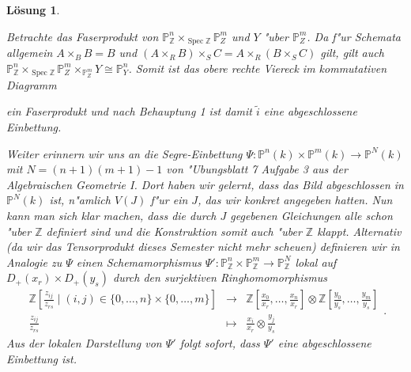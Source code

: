 \documentclass[paper = A4, fontsize=12pt, numbers=noendperiod, chapterprefix=true]{scrbook}
\theoremstyle{break}
\newtheorem{Loes}{L\"osung}
\theoremstyle{nonumberbreak}
\theoremstyle{nonumberplain}
\DeclareMathOperator{\Spec}{Spec}
\newcommand{\IP}{\mathbb{P}}%
\newcommand{\Z}{\mathbb{Z}}
\begin{document}
\begin{Loes}
\begin{enumerate}[a)]
 Betrachte das Faserprodukt von $\IP^n_{\Z} \times_{\Spec \Z} \IP^m_Z$ und $Y$ "uber $\IP^m_Z$.
 Da f"ur Schemata allgemein $A \times_B B = B$ und $(A \times_R B) \times_S C =  A \times_R (B \times_S C)$ gilt, gilt auch $\IP^n_{\Z} \times_{\Spec \Z} \IP^m_Z \times_{\IP^m_Z} Y \cong \IP^n_Y$. Somit ist das obere rechte Viereck im kommutativen Diagramm 
 
 \begin{minipage}{7.9cm}
 \centering
{}
\end{minipage}
\begin{minipage}{7cm}
  ein Faserprodukt und nach Behauptung 1 ist damit $\tilde{i}$ eine abgeschlossene Einbettung.
\end{minipage}

 Weiter erinnern wir uns an die Segre-Einbettung $\Psi \colon \IP^n(k) \times \IP^m(k) \to \IP^N(k)$ mit $N = (n+1)(m+1)-1$ von "Ubungsblatt 7 Aufgabe 3 aus der Algebraischen Geometrie I. Dort haben wir gelernt, dass das Bild abgeschlossen in $\IP^N(k)$ ist, n"amlich $V(J)$ f"ur ein $J$, das wir konkret angegeben hatten. 
 Nun kann man sich klar machen, dass die durch $J$ gegebenen Gleichungen alle schon "uber $\Z$ definiert sind und die Konstruktion somit auch "uber $\Z$ klappt. Alternativ (da wir das Tensorprodukt dieses Semester nicht mehr scheuen) definieren wir in Analogie zu $\Psi$ einen Schemamorphismus $\Psi' \colon \IP^n_{\Z} \times \IP^m_{\Z} \to \IP^N_{\Z}$ lokal auf $D_+(x_r) \times D_+(y_s)$ durch den surjektiven Ringhomomorphismus
 $$\begin{array}{ccc}
 \Z[\frac{z_{ij}} {z_{rs}} \mid (i,j) \in \{0,\dots,n\}\times \{0,\dots,m\}] & \longrightarrow & \Z[\frac{x_0}{x_r},\dots,\frac{x_n}{x_r}] \otimes \Z[\frac{y_0}{y_s},\dots,\frac{y_m}{y_s}] \\
 \frac{z_{ij}} {z_{rs}} & \mapsto & \frac{x_i}{x_r} \otimes \frac{y_j}{y_s}
 \end{array}.
 $$
Aus der lokalen Darstellung von $\Psi'$ folgt sofort, dass $\Psi'$ eine abgeschlossene Einbettung ist.


\end{enumerate}
\end{Loes}
\end{document}
